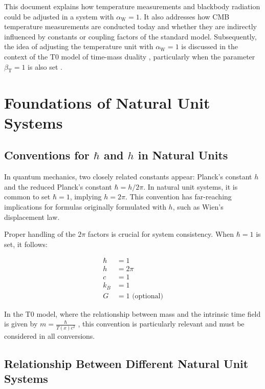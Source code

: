 \documentclass[12pt,a4paper]{article}
\newcommand{\Tfield}{T(x)}
\newcommand{\betaT}{\beta_{\text{T}}}
\newcommand{\alphaW}{\alpha_{\text{W}}}
\begin{document}
	This document explains how temperature measurements and blackbody radiation could be adjusted in a system with \(\alphaW = 1\). It also addresses how CMB temperature measurements are conducted today and whether they are indirectly influenced by constants or coupling factors of the standard model. Subsequently, the idea of adjusting the temperature unit with \(\alphaW = 1\) is discussed in the context of the T0 model of time-mass duality \cite{pascher_galaxies_2025}, particularly when the parameter \(\betaT = 1\) is also set \cite{pascher_params_2025}.
	
	\section{Foundations of Natural Unit Systems}
	
	\subsection{Conventions for \(\hbar\) and \(h\) in Natural Units}
	
	In quantum mechanics, two closely related constants appear: Planck’s constant \(h\) and the reduced Planck’s constant \(\hbar = h/2\pi\). In natural unit systems, it is common to set \(\hbar = 1\), implying \(h = 2\pi\). This convention has far-reaching implications for formulas originally formulated with \(h\), such as Wien’s displacement law.
	
	Proper handling of the \(2\pi\) factors is crucial for system consistency. When \(\hbar = 1\) is set, it follows:
	
	\begin{tcolorbox}[colback=blue!5!white,colframe=blue!75!black,title=Conventions in Natural Units]
		\begin{align}
			\hbar &= 1 \\
			h &= 2\pi \\
			c &= 1 \\
			k_B &= 1 \\
			G &= 1 \text{ (optional)}
		\end{align}
	\end{tcolorbox}
	
	In the T0 model, where the relationship between mass and the intrinsic time field is given by \(m = \frac{\hbar}{\Tfield c^2}\) \cite{pascher_galaxies_2025}, this convention is particularly relevant and must be considered in all conversions.
	
	\subsection{Relationship Between Different Natural Unit Systems}
	
\end{document}
